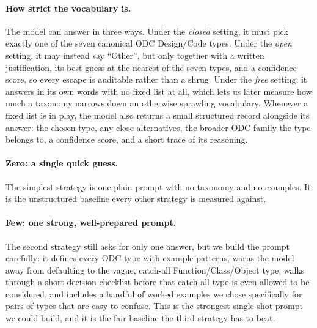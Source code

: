 
\paragraph{How strict the vocabulary is.}
The model can answer in three ways. Under the \textit{closed} setting, it must
pick exactly one of the seven canonical ODC Design/Code types. Under the
\textit{open} setting, it may instead say ``Other'', but only together with a
written justification, its best guess at the nearest of the seven types, and a
confidence score, so every escape is auditable rather than a shrug. Under the
\textit{free} setting, it answers in its own words with no fixed list at all,
which lets us later measure how much a taxonomy narrows down an otherwise
sprawling vocabulary. Whenever a fixed list is in play, the model also returns a
small structured record alongside its answer: the chosen type, any close
alternatives, the broader ODC family the type belongs to, a confidence score, and
a short trace of its reasoning.

\paragraph{Zero: a single quick guess.}
The simplest strategy is one plain prompt with no taxonomy and no examples. It is
the unstructured baseline every other strategy is measured against.

\paragraph{Few: one strong, well-prepared prompt.}
The second strategy still asks for only one answer, but we build the prompt
carefully: it defines every ODC type with example patterns, warns the model away
from defaulting to the vague, catch-all Function/Class/Object type, walks
through a short decision checklist before that catch-all type is even allowed
to be considered, and includes a handful of worked examples we chose
specifically for pairs of types that are easy to confuse. This is the strongest
single-shot prompt we could build, and it is the fair baseline the third
strategy has to beat.

